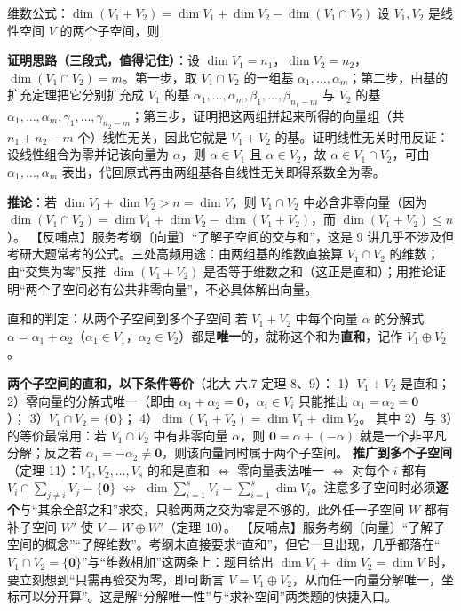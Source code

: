 \begin{fdeep}{维数公式：$\dim(V_1+V_2)=\dim V_1+\dim V_2-\dim(V_1\cap V_2)$}
设 $V_1,V_2$ 是线性空间 $V$ 的两个子空间，则

\textbf{证明思路（三段式，值得记住）}：设 $\dim V_1=n_1$，$\dim V_2=n_2$，$\dim(V_1\cap V_2)=m$。第一步，取 $V_1\cap V_2$ 的一组基 $\alpha_1,\dots,\alpha_m$；第二步，由基的扩充定理把它分别扩充成 $V_1$ 的基 $\alpha_1,\dots,\alpha_m,\beta_1,\dots,\beta_{n_1-m}$ 与 $V_2$ 的基 $\alpha_1,\dots,\alpha_m,\gamma_1,\dots,\gamma_{n_2-m}$；第三步，证明把这两组拼起来所得的向量组（共 $n_1+n_2-m$ 个）线性无关，因此它就是 $V_1+V_2$ 的基。证明线性无关时用反证：设线性组合为零并记该向量为 $\alpha$，则 $\alpha\in V_1$ 且 $\alpha\in V_2$，故 $\alpha\in V_1\cap V_2$，可由 $\alpha_1,\dots,\alpha_m$ 表出，代回原式再由两组基各自线性无关即得系数全为零。

\textbf{推论}：若 $\dim V_1+\dim V_2>n=\dim V$，则 $V_1\cap V_2$ 中必含非零向量（因为 $\dim(V_1\cap V_2)=\dim V_1+\dim V_2-\dim(V_1+V_2)$，而 $\dim(V_1+V_2)\le n$）。
【反哺点】服务考纲〔向量〕“了解子空间的交与和”，这是 9 讲几乎不涉及但考研大题常考的公式。三处高频用途：由两组基的维数直接算 $V_1\cap V_2$ 的维数；由“交集为零”反推 $\dim(V_1+V_2)$ 是否等于维数之和（这正是直和）；用推论证明“两个子空间必有公共非零向量”，不必具体解出向量。
\end{fdeep}

\begin{fdeep}{直和的判定：从两个子空间到多个子空间}
若 $V_1+V_2$ 中每个向量 $\alpha$ 的分解式 $\alpha=\alpha_1+\alpha_2$（$\alpha_1\in V_1$，$\alpha_2\in V_2$）都是\textbf{唯一}的，就称这个和为\textbf{直和}，记作 $V_1\oplus V_2$。

\textbf{两个子空间的直和，以下条件等价}（北大 六.7 定理 8、9）：
1）$V_1+V_2$ 是直和；
2）零向量的分解式唯一（即由 $\alpha_1+\alpha_2=\mathbf{0}$，$\alpha_i\in V_i$ 只能推出 $\alpha_1=\alpha_2=\mathbf{0}$）；
3）$V_1\cap V_2=\{\mathbf{0}\}$；
4）$\dim(V_1+V_2)=\dim V_1+\dim V_2$。
其中 2）与 3）的等价最常用：若 $V_1\cap V_2$ 中有非零向量 $\alpha$，则 $\mathbf{0}=\alpha+(-\alpha)$ 就是一个非平凡分解；反之若 $\alpha_1=-\alpha_2\ne\mathbf{0}$，则该向量同时属于两个子空间。
\textbf{推广到多个子空间}（定理 11）：$V_1,V_2,\dots,V_s$ 的和是直和 $\iff$ 零向量表法唯一 $\iff$ 对每个 $i$ 都有 $V_i\cap\sum_{j\ne i}V_j=\{\mathbf{0}\}$ $\iff$ $\dim\sum_{i=1}^{s}V_i=\sum_{i=1}^{s}\dim V_i$。注意多子空间时必须\textbf{逐个}与“其余全部之和”求交，只验两两之交为零是不够的。此外任一子空间 $W$ 都有补子空间 $W'$ 使 $V=W\oplus W'$（定理 10）。
【反哺点】服务考纲〔向量〕“了解子空间的概念”“了解维数”。考纲未直接要求“直和”，但它一旦出现，几乎都落在“$V_1\cap V_2=\{\mathbf{0}\}$”与“维数相加”这两条上：题目给出 $\dim V_1+\dim V_2=\dim V$ 时，要立刻想到“只需再验交为零，即可断言 $V=V_1\oplus V_2$，从而任一向量分解唯一，坐标可以分开算”。这是解“分解唯一性”与“求补空间”两类题的快捷入口。
\end{fdeep}

